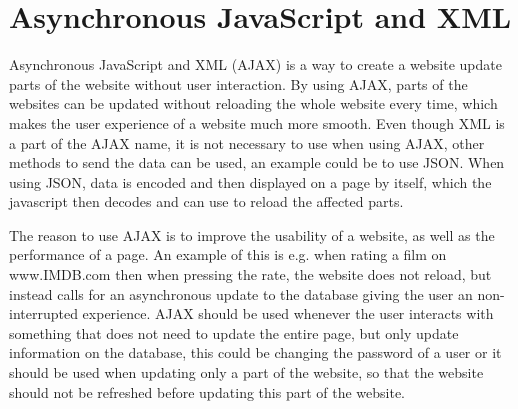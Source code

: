 \section{Asynchronous JavaScript and XML}
Asynchronous JavaScript and XML (AJAX) is a way to create a website update parts of the website without user interaction.
By using AJAX, parts of the websites can be updated without reloading the whole website every time, which makes the user experience of a website much more smooth.
Even though XML is a part of the AJAX name, it is not necessary to use when using AJAX, other methods to send the data can be used, an example could be to use JSON.
When using JSON, data is encoded and then displayed on a page by itself, which the javascript then decodes and can use to reload the affected parts.

The reason to use AJAX is to improve the usability of a website, as well as the performance of a page.
An example of this is e.g. when rating a film on www.IMDB.com \citep{misc:imdb} then when pressing the rate, the website does not reload, but instead calls for an asynchronous update to the database giving the user an non-interrupted experience.
AJAX should be used whenever the user interacts with something that does not need to update the entire page, but only update information on the database, this could be changing the password of a user or it should be used when updating only a part of the website, so that the website should not be refreshed before updating this part of the website.